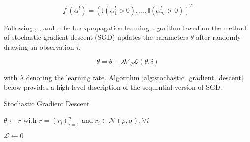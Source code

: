 
\begin{equation}
    f^{'}(\alpha^{l}) = ( \mathbb{I}(\alpha^{l}_{1} > 0), ..., \mathbb{I}(\alpha^{l}_{ n_{l} } > 0) )^{T}
\end{equation}

Following \cite{rojas1996neuralNetworks}, \cite{ruder2016gradientDescent}, and \cite{dixon2015annMarketPrediction},
the backpropagation learning algorithm based on the method of stochastic gradient descent (SGD) updates 
the parameters $ \theta $ after randomly drawing an observation $i$,

\begin{equation}
    \theta = \theta - \lambda \nabla_{ \theta } \mathscr{L}( \theta, i )
\end{equation}

with $\lambda$ denoting the learning rate.
Algorithm \ref{alg:stochastic_gradient_descent} below provides a high level description of the sequential version of
SGD.

\begin{algorithm}[H]
    \caption{ Stochastic Gradient Descent \cite{dixon2015annMarketPrediction} }


    $ \theta \leftarrow r $ with $ r = (r_{i})_{i=1}^{n}  $ and $ r_{i} \in \mathscr{N}( \mu, \sigma ), \forall i $


    $ \mathscr{L} \leftarrow 0 $



    \label{alg:stochastic_gradient_descent}
\end{algorithm}


